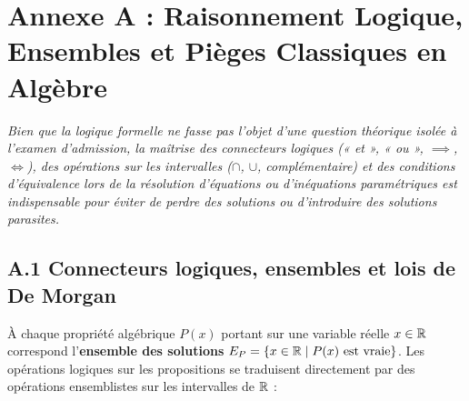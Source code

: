 \chapter*{Annexe A : Raisonnement Logique, Ensembles et Pièges Classiques en Algèbre}

\emph{Bien que la logique formelle ne fasse pas l'objet d'une question théorique isolée à l'examen d'admission, la maîtrise des connecteurs logiques (« et », « ou », $\implies$, $\iff$), des opérations sur les intervalles ($\cap$, $\cup$, complémentaire) et des conditions d'équivalence lors de la résolution d'équations ou d'inéquations paramétriques est indispensable pour éviter de perdre des solutions ou d'introduire des solutions parasites.}

\section*{A.1 Connecteurs logiques, ensembles et lois de De Morgan}

À chaque propriété algébrique $P(x)$ portant sur une variable réelle $x \in \mathbb{R}$ correspond l'\textbf{ensemble des solutions} $E_P = \{x \in \mathbb{R} \mid P(x) \text{ est vraie}\}$. Les opérations logiques sur les propositions se traduisent directement par des opérations ensemblistes sur les intervalles de $\mathbb{R}$ :

